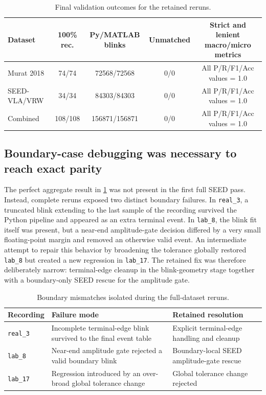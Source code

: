 \begin{table}[t]
\centering
\caption{Final validation outcomes for the retained reruns.}
\label{tab:parity}
\footnotesize
\begin{tabular}{@{}lcccc@{}}
\toprule
Dataset & 100\% rec. & Py/MATLAB blinks & Unmatched & Strict and lenient macro/micro metrics \\
\midrule
Murat 2018 & 74/74 & \num{72568}/\num{72568} & 0/0 & All P/R/F1/Acc values = 1.0 \\
SEED-VLA/VRW & 34/34 & \num{84303}/\num{84303} & 0/0 & All P/R/F1/Acc values = 1.0 \\
Combined & 108/108 & \num{156871}/\num{156871} & 0/0 & All P/R/F1/Acc values = 1.0 \\
\bottomrule
\end{tabular}
\end{table}

\subsection{Boundary-case debugging was necessary to reach exact parity}

The perfect aggregate result in \cref{tab:parity} was not present in the first full SEED pass. Instead, complete reruns exposed two distinct boundary failures. In \texttt{real\_3}, a truncated blink extending to the last sample of the recording survived the Python pipeline and appeared as an extra terminal event. In \texttt{lab\_8}, the blink fit itself was present, but a near-end amplitude-gate decision differed by a very small floating-point margin and removed an otherwise valid event. An intermediate attempt to repair this behavior by broadening the tolerance globally restored \texttt{lab\_8} but created a new regression in \texttt{lab\_17}. The retained fix was therefore deliberately narrow: terminal-edge cleanup in the blink-geometry stage together with a boundary-only SEED rescue for the amplitude gate.

\begin{table}[t]
\centering
\caption{Boundary mismatches isolated during the full-dataset reruns.}
\label{tab:edgecases}
\small
\begin{tabularx}{\linewidth}{@{}lXX@{}}
\toprule
Recording & Failure mode & Retained resolution \\
\midrule
\texttt{real\_3} & Incomplete terminal-edge blink survived to the final event table & Explicit terminal-edge handling and cleanup \\
\texttt{lab\_8} & Near-end amplitude gate rejected a valid boundary blink & Boundary-local SEED amplitude-gate rescue \\
\texttt{lab\_17} & Regression introduced by an over-broad global tolerance change & Global tolerance change rejected \\
\bottomrule
\end{tabularx}
\end{table}

